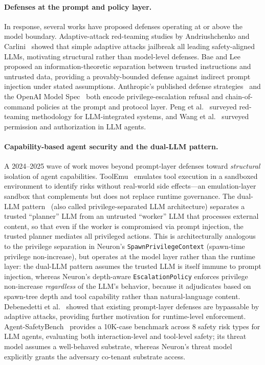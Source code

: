 \paragraph{Defenses at the prompt and policy layer.}
In response, several works have proposed defenses operating at or above
the model boundary. Adaptive-attack red-teaming studies by
Andriushchenko and Carlini~\cite{andriushchenko2024agent} showed that
simple adaptive attacks jailbreak all leading safety-aligned LLMs,
motivating structural rather than model-level defenses. Bae and
Lee~\cite{bae2024defending} proposed an information-theoretic separation
between trusted instructions and untrusted data, providing a
provably-bounded defense against indirect prompt injection under stated
assumptions. Anthropic's published defense
strategies~\cite{anthropic2024promptinjection} and the OpenAI Model
Spec~\cite{openai2024modelspec} both encode privilege-escalation refusal
and chain-of-command policies at the prompt and protocol layer.
Peng et al.~\cite{peng2024navigating} surveyed red-teaming methodology for
LLM-integrated systems, and Wang et al.~\cite{wang2024policy} surveyed
permission and authorization in LLM agents.

\paragraph{Capability-based agent security and the dual-LLM pattern.}
A 2024--2025 wave of work moves beyond prompt-layer defenses toward
\emph{structural} isolation of agent capabilities. ToolEmu~\cite{ruan2024toolemu}
emulates tool execution in a sandboxed environment to identify risks
without real-world side effects---an emulation-layer sandbox that
complements but does not replace runtime governance. The dual-LLM
pattern~\cite{anthropic2024dual} (also called privilege-separated LLM
architecture) separates a trusted ``planner'' LLM from an untrusted
``worker'' LLM that processes external content, so that even if the
worker is compromised via prompt injection, the trusted planner
mediates all privileged actions. This is architecturally analogous to
the privilege separation in Neuron's \texttt{SpawnPrivilegeContext}
(spawn-time privilege non-increase), but operates at the model layer
rather than the runtime layer: the dual-LLM pattern assumes the trusted
LLM is itself immune to prompt injection, whereas Neuron's
depth-aware \texttt{EscalationPolicy} enforces privilege non-increase
\emph{regardless} of the LLM's behavior, because it adjudicates based
on spawn-tree depth and tool capability rather than natural-language
content. Debenedetti et al.~\cite{debenedetti2024defeating} showed
that existing prompt-layer defenses are bypassable by adaptive attacks,
providing further motivation for runtime-level enforcement.
Agent-SafetyBench~\cite{zhang2024agentsafetybench} provides a 10K-case
benchmark across 8 safety risk types for LLM agents, evaluating both
interaction-level and tool-level safety; its threat model assumes a
well-behaved substrate, whereas Neuron's threat model explicitly grants
the adversary co-tenant substrate access.

